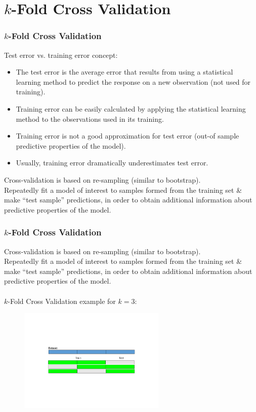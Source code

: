 \documentclass{beamer}
\begin{document}
\section{$k$-Fold Cross Validation} 


\begin{frame}
\frametitle{$k$-Fold Cross Validation}

Test error vs. training error concept:
\begin{itemize}
\item The test error is the average error that results from using a statistical learning method to predict the response on a new observation (not used for training).
\item Training error can be easily calculated by applying the statistical learning method to the observations used in its training.
\item Training error is not a good approximation for test error (out-of sample predictive properties of the model).
\item Usually, training error dramatically underestimates test error.
\end{itemize}
\bigskip
Cross-validation is based on re-sampling (similar to bootstrap).\\
\medskip
Repeatedly fit a model of interest to samples formed from the training set \& make ``test sample'' predictions, in order to obtain additional information about predictive properties of the model.\\

\end{frame}


\begin{frame}
\frametitle{$k$-Fold Cross Validation}
Cross-validation is based on re-sampling (similar to bootstrap).\\
\medskip
Repeatedly fit a model of interest to samples formed from the training set \& make ``test sample'' predictions, in order to obtain additional information about predictive properties of the model.\\
~\\
$k$-Fold Cross Validation example for $k=3$:

\begin{figure}
\includegraphics[trim=100 200 100 200,clip,width=7cm]{IMG/kFCV.pdf}
\end{figure}

\end{frame}
\end{document}
